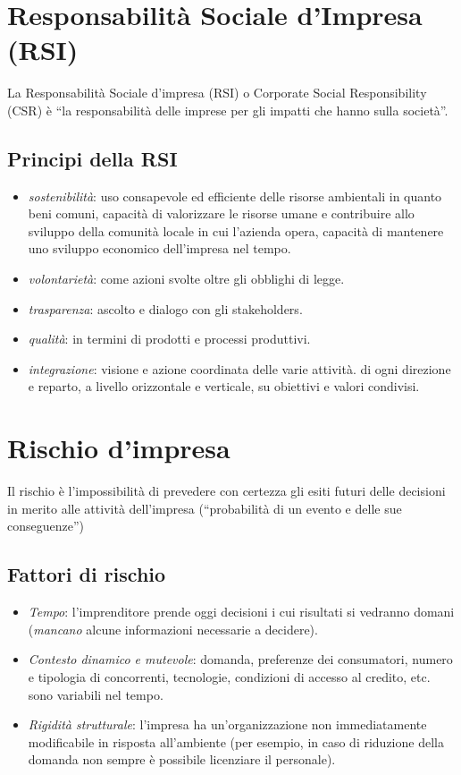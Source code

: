 \documentclass[10pt,a4paper,fleqn,oneside]{book}
\begin{document}
\section{Responsabilità Sociale d'Impresa (RSI)}
La Responsabilità Sociale d’impresa (RSI) o Corporate Social Responsibility
(CSR) è ``la responsabilità delle imprese per gli impatti che hanno sulla
società''.

\subsection{Principi della RSI}
\begin{itemize}
    \item \emph{sostenibilità}: uso consapevole ed efficiente delle risorse
    ambientali in quanto beni comuni, capacità di valorizzare le risorse umane
    e contribuire allo sviluppo della comunità locale in cui l’azienda opera,
    capacità di mantenere uno sviluppo economico dell’impresa nel tempo.
    \item \emph{volontarietà}: come azioni svolte oltre gli obblighi di legge.
    \item \emph{trasparenza}: ascolto e dialogo con gli \glspl{stakeholder}.
    \item \emph{qualità}: in termini di prodotti e processi produttivi.
    \item \emph{integrazione}: visione e azione coordinata delle varie attività.
    di ogni direzione e reparto, a livello orizzontale e verticale, su obiettivi
    e valori condivisi.
\end{itemize}

\section{Rischio d'impresa}
Il \gls{rischio} è l'impossibilità di prevedere con certezza gli esiti futuri delle decisioni
in merito alle attività dell’impresa (``probabilità di un evento e delle sue
conseguenze'')

\subsection{Fattori di rischio}
\begin{itemize}
    \item \emph{Tempo}: l'imprenditore prende oggi decisioni i cui risultati si
    vedranno domani (\emph{mancano} alcune informazioni necessarie a decidere).
    \item \emph{Contesto dinamico e mutevole}: domanda, preferenze dei
    consumatori, numero e tipologia di concorrenti, tecnologie, condizioni di
    accesso al credito, etc. sono variabili nel tempo.
    \item \emph{Rigidità strutturale}: l’impresa ha un’organizzazione non
    immediatamente modificabile in risposta all’ambiente (per esempio, in caso
    di riduzione della domanda non sempre è possibile licenziare il personale).
\end{itemize}
\end{document}
